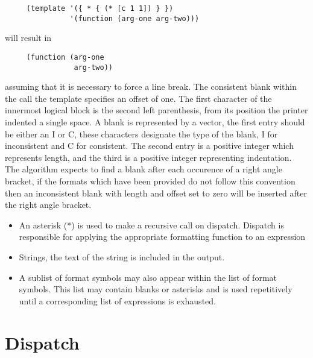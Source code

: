\begin{verbatim}
     (template '({ * { (* [c 1 1]) } })
               '(function (arg-one arg-two)))
\end{verbatim}

     will result in

\begin{verbatim}
     (function (arg-one
                arg-two))
\end{verbatim}

     assuming  that  it is necessary to force a line break.  The
     consistent blank within the call the template specifies  an
     offset  of  one.    The  first  character  of the innermost
     logical block is the  second  left  parenthesis,  from  its
     position  the  printer indented a single space.  A blank is
     represented by a vector, the first entry should  be  either
     an  I  or  C,  these  characters  designate the type of the
     blank, I for inconsistent and C for consistent. The  second
     entry  is  a  positive integer which represents length, and
     the third is a positive integer  representing  indentation.
     The  algorithm expects to find a blank after each occurence
     of a right angle bracket, if the formats  which  have  been
     provided do not follow this convention then an inconsistent
     blank  with  length and offset set to zero will be inserted
     after the right angle bracket.
\begin{itemize}
\item An asterisk (*) is used to make a recursive call on
     dispatch. Dispatch is responsible for applying the
     appropriate formatting function to an expression

\item Strings, the text of the string is included in the output.

\item A sublist of format symbols may also appear within the list
     of  format  symbols.   This  list  may  contain  blanks  or
     asterisks  and  is  used repetitively until a corresponding
     list of expressions is exhausted.
\end{itemize}

\section{Dispatch}

